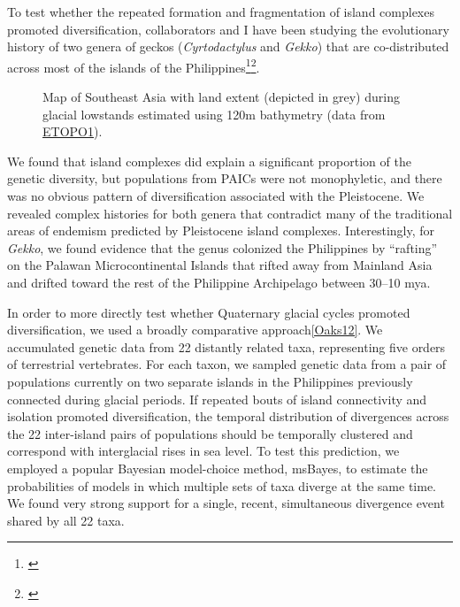 To test whether the repeated formation and fragmentation of island complexes
promoted diversification, collaborators and I have been studying the
evolutionary history of two genera of geckos (\emph{Cyrtodactylus} and
\emph{Gekko}) that are co-distributed across most of the islands of the
Philippines\footnote{\label{Siler10}}\super{,}\footnote{\label{Siler12}}.
\begin{figure}
  \vspace{-1.5em}
  \begin{center}
  \end{center}
  \vspace{-0.2em}
  \caption{Map of Southeast Asia with land extent (depicted in grey) during
  glacial lowstands estimated using 120m bathymetry (data from
  \href{http://ngdc.noaa.gov/mgg/global/global.html}{ETOPO1}).}
  \label{map}
  \vspace{-1.1em}
\end{figure}
We found that island complexes did explain a significant proportion of the
genetic diversity, but populations from PAICs were not monophyletic, and there
was no obvious pattern of diversification associated with the Pleistocene.
We revealed complex histories for both genera that contradict many of the
traditional areas of endemism predicted by Pleistocene island complexes.
Interestingly, for \emph{Gekko}, we found evidence that the genus colonized the
Philippines by ``rafting'' on the Palawan Microcontinental Islands that rifted
away from Mainland Asia and drifted toward the rest of the Philippine
Archipelago between 30--10 mya.

In order to more directly test whether Quaternary glacial cycles promoted
diversification, we used a broadly comparative approach\cref{Oaks12}.
We accumulated genetic data from 22 distantly related taxa, representing five
orders of terrestrial vertebrates.
For each taxon, we sampled genetic data from a pair of populations currently on
two separate islands in the Philippines previously connected during glacial
periods.
If repeated bouts of island connectivity and isolation promoted
diversification, the temporal distribution of divergences across the 22
inter-island pairs of populations should be temporally clustered and correspond
with interglacial rises in sea level.
To test this prediction, we employed a popular Bayesian model-choice method,
msBayes, to estimate the probabilities of models in which multiple sets of taxa
diverge at the same time.
We found very strong support
for a single, recent, simultaneous divergence event shared by all 22 taxa.

